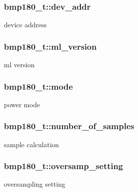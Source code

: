 \subsubsection[{\texorpdfstring{dev\+\_\+addr}{dev_addr}}]{ bmp180\+\_\+t\+::dev\+\_\+addr}\hypertarget{structbmp180__t_a1fac092bc595a86dc1dae9604f557d5e}{}\label{structbmp180__t_a1fac092bc595a86dc1dae9604f557d5e}
device address 
\subsubsection[{\texorpdfstring{ml\+\_\+version}{ml_version}}]{ bmp180\+\_\+t\+::ml\+\_\+version}\hypertarget{structbmp180__t_a369cb61fc9c7de06061f13eb8be5aa34}{}\label{structbmp180__t_a369cb61fc9c7de06061f13eb8be5aa34}
ml version 
\subsubsection[{\texorpdfstring{mode}{mode}}]{ bmp180\+\_\+t\+::mode}\hypertarget{structbmp180__t_ac5514a7ce3e3d23f7a6722711039edba}{}\label{structbmp180__t_ac5514a7ce3e3d23f7a6722711039edba}
power mode 
\subsubsection[{\texorpdfstring{number\+\_\+of\+\_\+samples}{number_of_samples}}]{ bmp180\+\_\+t\+::number\+\_\+of\+\_\+samples}\hypertarget{structbmp180__t_a919c92f3b67c115eb7546855d3322f8f}{}\label{structbmp180__t_a919c92f3b67c115eb7546855d3322f8f}
sample calculation 
\subsubsection[{\texorpdfstring{oversamp\+\_\+setting}{oversamp_setting}}]{ bmp180\+\_\+t\+::oversamp\+\_\+setting}\hypertarget{structbmp180__t_a6ade944cf9275b333add5785f33701bd}{}\label{structbmp180__t_a6ade944cf9275b333add5785f33701bd}
oversampling setting 

